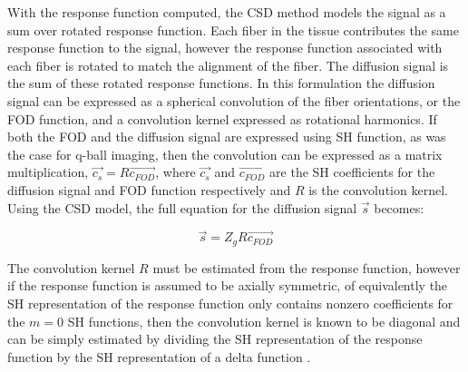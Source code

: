 With the response function computed, the CSD method models the signal as a sum over rotated response function. Each fiber in the tissue contributes the same response function to the signal, however the response function associated with each fiber is rotated to match the alignment of the fiber. The diffusion signal is the sum of these rotated response functions. In this formulation the diffusion signal can be expressed as a spherical convolution of the fiber orientations, or the FOD function, and a convolution kernel expressed as rotational harmonics\cite{Tournier_2004}. If both the FOD and the diffusion signal are expressed using SH function, as was the case for q-ball imaging, then the convolution can be expressed as a matrix multiplication, $\vec{c_s} = R\vec{c_{FOD}}$, where $\vec{c_s}$ and $\vec{c_{FOD}}$ are the SH coefficients for the diffusion signal and FOD function respectively and $R$ is the convolution kernel. Using the CSD model, the full equation for the diffusion signal $\vec{s}$ becomes:

\begin{equation}
\vec{s} = Z_gR\vec{c_{FOD}}
\end{equation}

The convolution kernel $R$ must be estimated from the response function, however if the response function is assumed to be axially symmetric, of equivalently the SH representation of the response function only contains nonzero coefficients for the $m = 0$ SH functions, then the convolution kernel is known to be diagonal and can be simply estimated by dividing the SH representation of the response function by the SH representation of a delta function \cite{Tournier_2007}.

